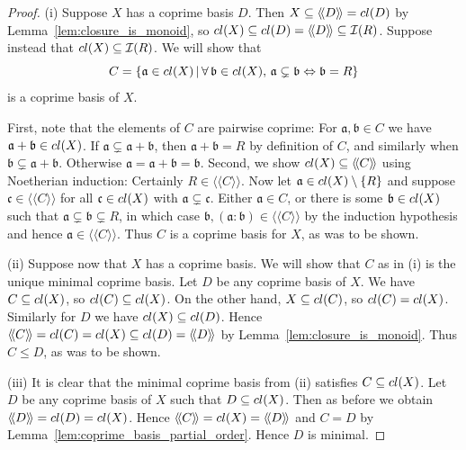 \documentclass[10pt,a4paper]{amsart}
\newcommand{\lla}{\langle\!\langle}
\newcommand{\rra}{\rangle\!\rangle}
\begin{document}
\begin{proof}
(i) Suppose \(X\) has a coprime basis \(D\).
Then \(X\subseteq \lla D\rra = \textup{cl}(D)\) by Lemma~\ref{lem:closure_is_monoid}, so \(\textup{cl}(X)\subseteq\textup{cl}(D)=\lla D\rra \subseteq\mathcal{I}(R)\). 
Suppose instead that \(\textup{cl}(X)\subseteq \mathcal{I}(R)\).
We will show that
\[C=\{ \mathfrak{a}\in \textup{cl}(X) \,|\, \forall\, \mathfrak{b}\in \textup{cl}(X),\, \mathfrak{a}\subsetneq \mathfrak{b} \Leftrightarrow \mathfrak{b}=R\}\]
is a coprime basis of \(X\).

First, note that the elements of \(C\) are pairwise coprime: For \(\mathfrak{a},\mathfrak{b}\in C\) we have \(\mathfrak{a}+\mathfrak{b}\in \textup{cl}(X)\). If \(\mathfrak{a}\subsetneq \mathfrak{a}+\mathfrak{b}\), then \(\mathfrak{a}+\mathfrak{b}=R\) by definition of \(C\), and similarly when \(\mathfrak{b}\subsetneq\mathfrak{a}+\mathfrak{b}\). Otherwise \(\mathfrak{a}=\mathfrak{a}+\mathfrak{b}=\mathfrak{b}\).
Second, we show \(\textup{cl}(X)\subseteq\lla C\rra\) using Noetherian induction:
Certainly \(R\in\lla C\rra\). 
Now let \(\mathfrak{a}\in \textup{cl}(X)\setminus\{R\}\) and suppose \(\mathfrak{c}\in\lla C\rra\) for all \(\mathfrak{c}\in \textup{cl}(X)\) with \(\mathfrak{a}\subsetneq \mathfrak{c}\).
Either \(\mathfrak{a}\in C\), or there is some \(\mathfrak{b}\in \textup{cl}(X)\) such that \(\mathfrak{a}\subsetneq \mathfrak{b} \subsetneq R\), in which case \(\mathfrak{b}, (\mathfrak{a}:\mathfrak{b})\in\lla C\rra\) by the induction hypothesis and hence \(\mathfrak{a}\in\lla C\rra\). Thus \(C\) is a coprime basis for \(X\), as was to be shown.

(ii) Suppose now that \(X\) has a coprime basis. 
We will show that \(C\) as in (i) is the unique minimal coprime basis.
Let \(D\) be any coprime basis of \(X\).
We have \(C\subseteq\textup{cl}(X)\), so \(\textup{cl}(C) \subseteq \textup{cl}(X)\).
On the other hand, \(X\subseteq \textup{cl}(C)\), so \(\textup{cl}(C)=\textup{cl}(X)\).
Similarly for \(D\) we have \(\textup{cl}(X)\subseteq\textup{cl}(D)\).
Hence \(\lla C \rra =\textup{cl}(C)=\textup{cl}(X)\subseteq\textup{cl}(D)=\lla D\rra\) by Lemma~\ref{lem:closure_is_monoid}.
Thus \(C\leq D\), as was to be shown.

(iii) It is clear that the minimal coprime basis from (ii) satisfies \(C\subseteq\textup{cl}(X)\).
Let \(D\) be any coprime basis of \(X\) such that \(D\subseteq\textup{cl}(X)\).
Then as before we obtain \(\lla D\rra = \textup{cl}(D)=\textup{cl}(X)\).
Hence \(\lla C \rra = \textup{cl}(X)=\lla D\rra\) and \(C=D\) by Lemma~\ref{lem:coprime_basis_partial_order}. Hence \(D\) is minimal.
\end{proof}
\end{document}
